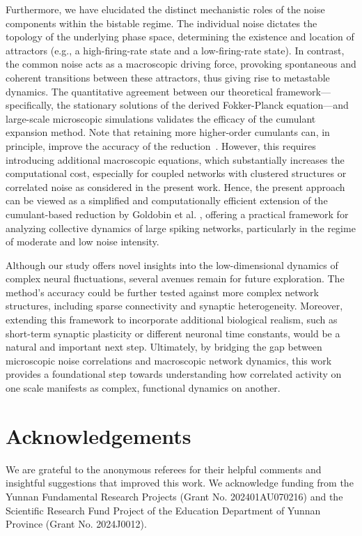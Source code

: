 \documentclass[aps,twocolumn,pre]{revtex4-2}
\begin{document}
Furthermore, we have elucidated the distinct mechanistic roles of the noise components within the bistable regime. The individual noise dictates the topology of the underlying phase space, determining the existence and location of attractors (e.g., a high-firing-rate state and a low-firing-rate state). In contrast, the common noise acts as a macroscopic driving force, provoking spontaneous and coherent transitions between these attractors, thus giving rise to metastable dynamics. The quantitative agreement between our theoretical framework—specifically, the stationary solutions of the derived Fokker-Planck equation—and large-scale microscopic simulations validates the efficacy of the cumulant expansion method. 
Note that retaining more higher-order cumulants can, in principle, improve the accuracy of the reduction~\cite{goldobin2024macroscopic}. However, this requires introducing additional macroscopic equations, which substantially increases the computational cost, especially for coupled networks with clustered structures or correlated noise as considered in the present work. Hence, the present approach can be viewed as a simplified and computationally efficient extension of the cumulant-based reduction by Goldobin et al. \cite{goldobin2021reduction}, offering a practical framework for analyzing collective dynamics of large spiking networks, particularly in the regime of moderate and low noise intensity.

Although our study offers novel insights into the low-dimensional dynamics of complex neural fluctuations, several avenues remain for future exploration. The method's accuracy could be further tested against more complex network structures, including sparse connectivity and synaptic heterogeneity. Moreover, extending this framework to incorporate additional biological realism, such as short-term synaptic plasticity or different neuronal time constants, would be a natural and important next step. Ultimately, by bridging the gap between microscopic noise correlations and macroscopic network dynamics, this work provides a foundational step towards understanding how correlated activity on one scale manifests as complex, functional dynamics on another.

\section{Acknowledgements}
We are grateful to the anonymous referees for their helpful comments and insightful suggestions that improved this work. We acknowledge funding from the Yunnan Fundamental Research Projects (Grant No. 202401AU070216) and the Scientific Research Fund Project of the Education Department of Yunnan Province (Grant No. 2024J0012).
\end{document}
